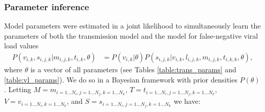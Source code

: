 \documentclass{article}[11pt]
\begin{document}

\subsubsection*{Parameter inference}
Model parameters were estimated in a joint likelihood to simultaneously learn the parameters of both the transmission model and the model for false-negative viral load values
\begin{align}
P(v_{i,k}, s_{i,j,k} | m_{i,j,k}, t_{i,k}, \theta) &= 
P(v_{i,k} | \theta)P(s_{i,j,k} | v_{i,k}, l_{i,j,k}, m_{i,j,k}, t_{i,k,k},\theta),\end{align}
where $\theta$ is a vector of all parameters (see Tables \ref{table:trans_params} and \ref{table:vl_params}). We do so in a Bayesian framework with prior densities $P(\theta)$. Letting \newline $M = m_{i=1...N_i, j=1...N_j, k=1...N_k}$,  $T = t_{i=1...N_i, j=1...N_j, k=1...N_k}$, $V = v_{i=1...N_i, k=1...N_k}$, and $S=s_{i=1...N_i, j=1...N_j,k=1...N_k}$ we have:  
\end{document}
